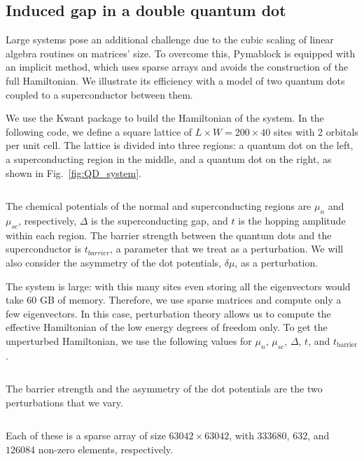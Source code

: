 \subsection{Induced gap in a double quantum dot}

Large systems pose an additional challenge due to the cubic scaling of linear
algebra routines on matrices' size.
To overcome this, Pymablock is equipped with an implicit method, which uses
sparse arrays and avoids the construction of the full Hamiltonian.
We illustrate its efficiency with a model of two quantum dots coupled to a
superconductor between them.

We use the Kwant package \cite{Groth_2014} to build the Hamiltonian of the
system.
In the following code, we define a square lattice of $L \times W = 200 \times
40$ sites with 2 orbitals per unit cell.
The lattice is divided into three regions: a quantum dot on the left, a
superconducting region in the middle, and a quantum dot on the right,
as shown in Fig.~\ref{fig:QD_system}.
%
\inputminted[firstline=15, lastline=48]{ipython}{code_figures/lattice_system.py}
%
The chemical potentials of the normal and superconducting regions are $\mu_n$
and $\mu_{sc}$, respectively, $\Delta$ is the superconducting gap, and $t$
is the hopping amplitude within each region.
The barrier strength between the quantum dots and the superconductor is
$t_{barrier}$, a parameter that we treat as a perturbation.
We will also consider the asymmetry of the dot potentials, $\delta \mu$, as a
perturbation.
%

The system is large: with this many sites even storing all the eigenvectors
would take 60 GB of memory.
Therefore, we use sparse matrices and compute only a few eigenvectors.
In this case, perturbation theory allows us to compute the effective
Hamiltonian of the low energy degrees of freedom only.
To get the unperturbed Hamiltonian, we use the following values for $\mu_n$,
$\mu_{sc}$, $\Delta$, $t$, and $t_{\text{barrier}}$.
%
\inputminted[firstline=50, lastline=51]{ipython}{code_figures/lattice_system.py}
%
The barrier strength and the asymmetry of the dot potentials are the two
perturbations that we vary.
%
\inputminted[firstline=53, lastline=58]{ipython}{code_figures/lattice_system.py}
Each of these is a sparse array of size $63042 \times 63042$, with $333680$,
$632$, and $126084$ non-zero elements, respectively.

